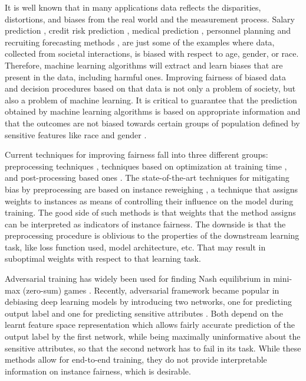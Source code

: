 \documentclass[preprint,12pt]{elsarticle}
\begin{document}
It is well known that in many applications data reflects the disparities, distortions, and biases from the real world and the measurement process. Salary prediction \cite{innocenti2016mining}, credit risk prediction \cite{li2019credit}, medical prediction \cite{boyd1996relationship}, personnel planning and recruiting forecasting methods \cite{kim2016data}, are just some of the examples where data, collected from societal interactions, is biased with respect to age, gender, or race. Therefore, machine learning algorithms will extract and learn biases that are present in the data, including harmful ones.
Improving fairness of biased data and decision procedures based on that data is not only a problem of society, but also a problem of machine learning.  It is critical to guarantee that the prediction obtained by machine learning algorithms is based on appropriate information and that the outcomes are not biased towards certain groups of population defined by sensitive features like race and gender \cite{wang2019approaching}.

Current techniques for improving fairness fall into three different groups: preprocessing techniques \cite{kamiran2012decision,calmon2017optimized}, techniques based on optimization at training time \cite{zafar2019fairness,adel2019one,celis2019classification,kamishima2012fairness}, and post-processing based ones \cite{hardt2016equality, pleiss2017fairness}. The state-of-the-art techniques for mitigating bias by preprocessing are based on instance reweighing \cite{kamiran2012data}, a technique that assigns weights to instances as means of controlling their influence on the model during training. The good side of such methods is that weights that the method assigns can be interpreted as indicators of instance fairness. The downside is that the preprocessing procedure is oblivious to 
the properties of the downstream learning task, like loss function used, model architecture, etc. That may result in suboptimal weights with respect to that learning task.

Adversarial training has widely been used for finding Nash equilibrium in mini-max (zero-sum) games \cite{goodfellow2014generative}. Recently, adversarial framework became popular in debiasing deep learning models by introducing two networks, one for predicting output label and one for predicting sensitive attributes \cite{wadsworth2018achieving} \cite{madras2018learning} \cite{cevora2020fair} \cite{grari2020adversarial}. Both depend on the learnt feature space representation which allows fairly accurate prediction of the output label by the first network, while being maximally uninformative about the sensitive attributes, so that the second network has to fail in its task. While these methods allow for end-to-end training, they do not provide interpretable information on instance fairness, which is desirable.
\end{document}
